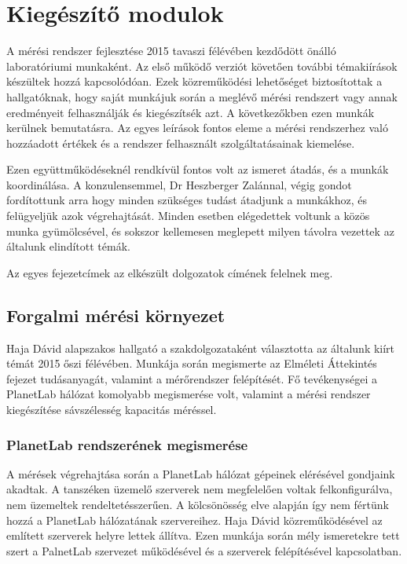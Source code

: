 \chapter{Kiegészítő modulok}


A mérési rendszer fejlesztése 2015 tavaszi félévében kezdődött önálló laboratóriumi munkaként. Az első működő verziót követően további témakiírások készültek hozzá kapcsolódóan. Ezek közreműködési lehetőséget biztosítottak a hallgatóknak, hogy saját munkájuk során a meglévő mérési rendszert vagy annak eredményeit felhasználják és kiegészítsék azt. A következőkben ezen munkák kerülnek bemutatásra. Az egyes leírások fontos eleme a mérési rendszerhez való hozzáadott értékek és a rendszer felhasznált szolgáltatásainak kiemelése.

Ezen együttműködéseknél rendkívül fontos volt az ismeret átadás, és a munkák koordinálása. A konzulensemmel, Dr Heszberger Zalánnal, végig gondot fordítottunk arra hogy minden szükséges tudást átadjunk a munkákhoz, és felügyeljük azok végrehajtását. Minden esetben elégedettek voltunk a közös munka gyümölcsével, és sokszor kellemesen meglepett milyen távolra vezettek az általunk elindított témák.

Az egyes fejezetcímek az elkészült dolgozatok címének felelnek meg.


\section{Forgalmi mérési környezet}


Haja Dávid alapszakos hallgató a szakdolgozataként választotta az általunk kiírt témát 2015 őszi félévében. Munkája során megismerte az Elméleti Áttekintés fejezet tudásanyagát, valamint a mérőrendszer felépítését. Fő tevékenységei a PlanetLab hálózat komolyabb megismerése volt, valamint a mérési rendszer kiegészítése sávszélesség kapacitás méréssel.

\subsection*{PlanetLab rendszerének megismerése}
A mérések végrehajtása során a PlanetLab hálózat gépeinek elérésével gondjaink akadtak. A tanszéken üzemelő szerverek nem megfelelően voltak felkonfigurálva, nem üzemeltek rendeltetésszerűen. A kölcsönösség elve alapján így nem fértünk hozzá a PlanetLab hálózatának szervereihez.
Haja Dávid közreműködésével az említett szerverek helyre lettek állítva. Ezen munkája során mély ismeretekre tett szert a PalnetLab szervezet működésével és a szerverek felépítésével kapcsolatban.

